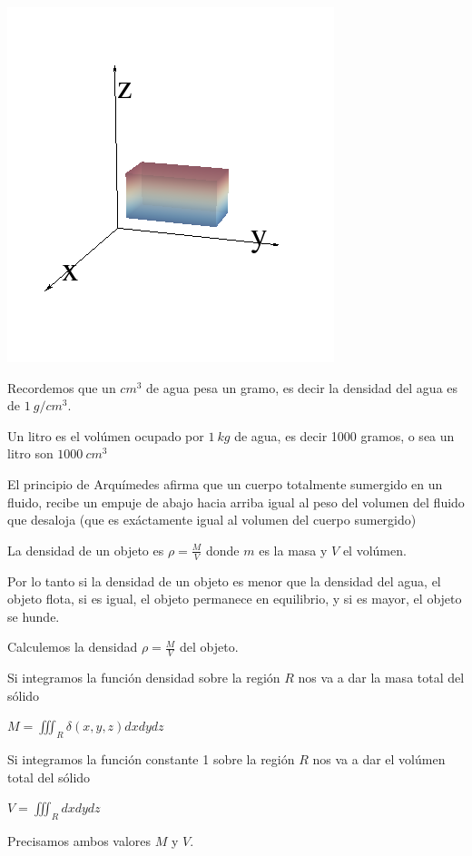 \begin{center}
\includegraphics[scale=0.7]{images/04_analisis2/multiples3.png}
\end{center}

Recordemos que un $cm^3$ de agua pesa un gramo, es decir la densidad del agua es de $1 \ g/cm^3$.

Un litro es el volúmen ocupado por $1 \ kg$ de agua, es decir 1000 gramos, o sea un litro son $1000 \ cm^3$

El principio de Arquímedes afirma que un cuerpo totalmente sumergido en un fluido, recibe un empuje de abajo hacia arriba igual al peso del volumen del fluido que desaloja (que es exáctamente igual al volumen del cuerpo sumergido)

La densidad de un objeto es $\rho = \frac{M}{V}$ donde $m$ es la masa y $V$ el volúmen.

Por lo tanto si la densidad de un objeto es menor que la densidad del agua, el objeto flota, si es igual, el objeto permanece en equilibrio, y si es mayor, el objeto se hunde.

Calculemos la densidad $\rho = \frac{M}{V}$ del objeto.

Si integramos la función densidad sobre la región $R$ nos va a dar la masa total del sólido 

$M = \iiint_R \delta(x,y,z) dxdydz$

Si integramos la función constante 1 sobre la región $R$ nos va a dar el volúmen total del sólido

$V = \iiint_R dxdydz$

Precisamos ambos valores $M$ y $V$.

